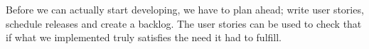 Before we can actually start developing, we have to plan ahead; write user stories, schedule releases and create a backlog. The user stories can be used to check that if what we implemented truly satisfies the need it had to fulfill.